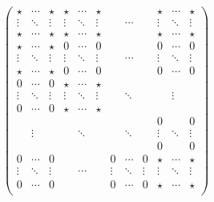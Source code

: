 \begin{align*}
	\left(\begin{array}{cccccccccccc}
		\star  & \cdots & \star  & \star  & \cdots & \star  &        &        &        & \star  & \cdots & \star  \\
		\vdots & \ddots & \vdots & \vdots & \ddots & \vdots &        & \cdots &        & \vdots & \ddots & \vdots \\
		\star  & \cdots & \star  & \star  & \cdots & \star  &        &        &        & \star  & \cdots & \star  \\
		\hline
		\star  & \cdots & \star  & 0      & \cdots & 0      &        &        &        & 0      & \cdots & 0      \\
		\vdots & \ddots & \vdots & \vdots & \ddots & \vdots &        & \cdots &        & \vdots & \ddots & \vdots \\
		\star  & \cdots & \star  & 0      & \cdots & 0      &        &        &        & 0      & \cdots & 0      \\
		0      & \cdots & 0      & \star  & \cdots & \star  &        &        &        &        &        &        \\
		\vdots & \ddots & \vdots & \vdots & \ddots & \vdots &        & \ddots &        &        & \vdots &        \\
		0      & \cdots & 0      & \star  & \cdots & \star  &        &        &        &        &        &        \\
		       &        &        &        &        &        &        &        &        & 0      &        & 0      \\
		       & \vdots &        &        & \ddots &        &        & \ddots &        & \vdots & \ddots & \vdots \\
		       &        &        &        &        &        &        &        &        & 0      &        & 0      \\
		0      & \cdots & 0      &        &        &        & 0      & \cdots & 0      & \star  & \cdots & \star  \\
		\vdots & \ddots & \vdots &        & \cdots &        & \vdots & \ddots & \vdots & \vdots & \ddots & \vdots \\
		0      & \cdots & 0      &        &        &        & 0      & \cdots & 0      & \star  & \cdots & \star  \\
	\end{array}\right)
\end{align*}

